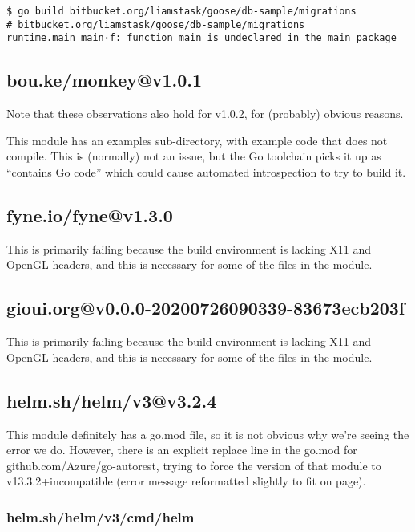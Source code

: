 \documentclass[a4paper]{paper}
\begin{document}
\begin{verbatim}
$ go build bitbucket.org/liamstask/goose/db-sample/migrations
# bitbucket.org/liamstask/goose/db-sample/migrations
runtime.main_main·f: function main is undeclared in the main package
\end{verbatim}

\subsection{bou.ke/monkey@v1.0.1}

Note that these observations also hold for v1.0.2, for (probably) obvious reasons.

This module has an examples sub-directory, with example code that does
not compile. This is (normally) not an issue, but the Go toolchain
picks it up as ``contains Go code'' which could cause automated
introspection to try to build it.

\subsection{fyne.io/fyne@v1.3.0}

This is primarily failing because the build environment is lacking X11
and OpenGL headers, and this is necessary for some of the files in the
module.

\subsection{gioui.org@v0.0.0-20200726090339-83673ecb203f}

This is primarily failing because the build environment is lacking X11
and OpenGL headers, and this is necessary for some of the files in the
module.


\subsection{helm.sh/helm/v3@v3.2.4}

This module definitely has a go.mod file, so it is not obvious why we're seeing the error we do. However, there is an explicit replace line in the go.mod for github.com/Azure/go-autorest, trying to force the version of that module to v13.3.2+incompatible (error message reformatted slightly to fit on page). 

\subsubsection{helm.sh/helm/v3/cmd/helm}
\end{document}
